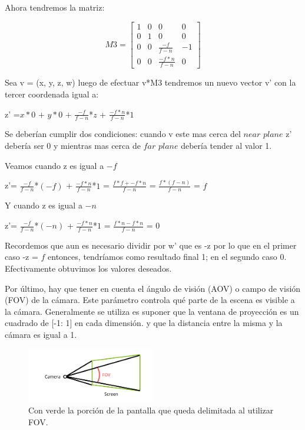 \documentclass[a4paper]{article}
\begin{document}
Ahora tendremos la matriz:

\[
M3 =
\begin{bmatrix}
1 & 0 & 0 & 0 \\
0 & 1 & 0 & 0 \\
0 & 0 & \frac{-f}{f-n} & -1 \\
0 & 0 & \frac{-f*n}{f-n} & 0  
\end{bmatrix}
\]

Sea v = (x, y, z, w) luego de efectuar v*M3 tendremos un nuevo vector v' con la tercer coordenada igual a: 


z' =$x*0$ $+$ $y*0$ $+$ $\frac{-f}{f-n}$*$z$ + $\frac{-f*n}{f-n}$*$1$

Se deberían cumplir dos condiciones: cuando v este mas cerca del $near$ $plane$ z' debería ser 0 y mientras mas cerca de $far$ $plane$ debería tender al valor 1. 


 Veamos cuando z es igual a $-f$
 
 z'= $\frac{-f}{f-n}$*$(-f)$ + $\frac{-f*n}{f-n}$*$1$ = $\frac{f*f + -f*n}{f-n}$ = $\frac{f*(f-n)}{f-n}$ = $f$
 
 
 Y cuando z es igual a $-n$
 
 
 z'= $\frac{-f}{f-n}$*$(-n)$ + $\frac{-f*n}{f-n}$*$1$ = $\frac{f*n - f*n}{f-n}$ = $0$
 
Recordemos que aun es necesario dividir por w' que es -z por lo que en el primer caso -z = $f$ entonces, tendríamos como resultado final 1; en el segundo caso 0. Efectivamente obtuvimos los valores deseados.


Por último, hay que tener en cuenta el ángulo de visión (AOV)  o campo de visión (FOV) de la cámara. Este parámetro controla qué parte de la escena es visible a la cámara.\newline
Generalmente se utiliza es suponer que la ventana de proyección es un cuadrado de [-1: 1] en cada dimensión. y que la distancia entre la misma y la cámara es igual a 1. 


\begin{figure}[h]
    \centering
    \includegraphics[width=0.50\textwidth]{Imagenes/d.png}
    \caption{Con verde la porción de la pantalla que queda delimitada al utilizar FOV.}
    \label{fig:mesh1}
\end{figure}
\end{document}
